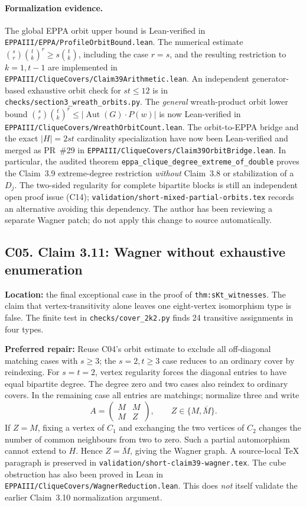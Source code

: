 \documentclass[11pt,a4paper]{article}
\begin{document}
\paragraph{Formalization evidence.}
The global EPPA orbit upper bound is Lean-verified in
\texttt{EPPAIII/EPPA/ProfileOrbitBound.lean}.
The numerical estimate
\(\binom{s}{r}\binom{t}{k}^{r}
\ge s\binom{t}{k}\), including the case \(r=s\),
and the resulting restriction to \(k=1,t-1\)
are implemented in
\texttt{EPPAIII/CliqueCovers/Claim39Arithmetic.lean}.
An independent generator-based exhaustive orbit check
for \(st\le12\) is in
\texttt{checks/section3\_wreath\_orbits.py}.
The \emph{general} wreath-product orbit lower bound
\(\binom{s}{r}\binom{t}{k}^{r}\le
|\operatorname{Aut}(G)\cdot P(w)|\) is now Lean-verified
in \texttt{EPPAIII/CliqueCovers/WreathOrbitCount.lean}.
The orbit-to-EPPA bridge and the exact \(|H|=2st\)
cardinality specialization have now been Lean-verified
and merged as PR~\#29 in
\texttt{EPPAIII/CliqueCovers/Claim39OrbitBridge.lean}.
In particular, the audited theorem
\texttt{eppa\_clique\_degree\_extreme\_of\_double}
proves the Claim~3.9 extreme-degree restriction
\emph{without} Claim~3.8 or stabilization of a \(D_j\).
The two-sided regularity for complete bipartite blocks
is still an independent open proof issue (C14);
\texttt{validation/short-mixed-partial-orbits.tex}
records an alternative avoiding this dependency.
The author has been reviewing a separate Wagner patch;
do not apply this change to source automatically.

\subsection*{C05. Claim 3.11: Wagner without exhaustive enumeration}
\textbf{Location:} the final exceptional case in the
proof of \texttt{thm:sKt\_witnesses}.
The claim that vertex-transitivity alone leaves
one eight-vertex isomorphism type is false.
The finite test in \texttt{checks/cover\_2k2.py}
finds 24 transitive assignments in four types.

\textbf{Preferred repair:}
Reuse C04's orbit estimate to exclude all
off-diagonal matching cases with \(s\ge3\);
the \(s=2,t\ge3\) case reduces to an ordinary
cover by reindexing. For \(s=t=2\),
vertex regularity forces the diagonal entries
to have equal bipartite degree. The degree
zero and two cases also reindex to ordinary
covers. In the remaining case all entries are
matchings; normalize three and write
\[
 A=\begin{pmatrix}M&M\\M&Z\end{pmatrix},
 \qquad Z\in\{M,\overline M\}.
\]
If \(Z=M\), fixing a vertex of \(C_1\)
and exchanging the two vertices of \(C_2\)
changes the number of common neighbours
from two to zero. Such a partial automorphism
cannot extend to \(H\). Hence \(Z=\overline M\),
giving the Wagner graph.
A source-local TeX paragraph is preserved in
\texttt{validation/short-claim39-wagner.tex}.
The cube obstruction has also been proved in Lean in
\texttt{EPPAIII/CliqueCovers/WagnerReduction.lean}.
This does \emph{not} itself validate the earlier
Claim~3.10 normalization argument.
\end{document}
